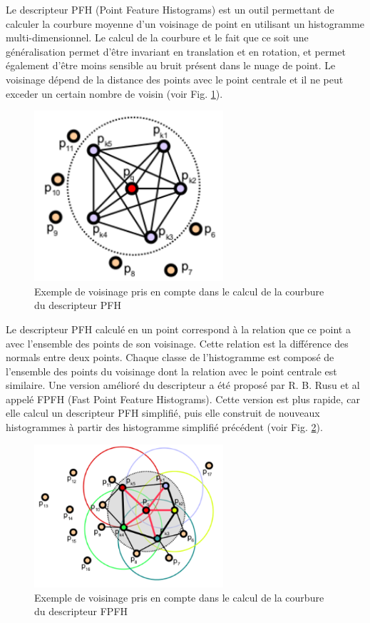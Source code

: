 Le descripteur PFH\cite{PFH} (Point Feature Histograms) est un outil permettant de calculer la courbure moyenne d'un voisinage de point en utilisant
un histogramme multi-dimensionnel. Le calcul de la courbure et le fait que ce soit une généralisation permet d'être invariant 
en translation et en rotation, et permet également d'être moins sensible au bruit présent dans le nuage de point. Le voisinage 
dépend de la distance des points avec le point centrale et il ne peut exceder un certain nombre de voisin (voir Fig. \ref{fig:pfhNeighborhood}).

\begin{figure}[!h]
  \begin{center}
    \includegraphics[width=7cm]{image/PFH.png}
    \caption{Exemple de voisinage pris en compte dans le calcul de la courbure du descripteur PFH}
    \label{fig:pfhNeighborhood}
  \end{center}
\end{figure}

Le descripteur PFH calculé en un point correspond à la relation que ce point a avec l'ensemble des points de son voisinage. Cette relation
est la différence des normals entre deux points. Chaque classe de l'histogramme est composé de l'ensemble des points du voisinage dont 
la relation avec le point centrale est similaire. Une version amélioré du descripteur a été proposé par R. B. Rusu et al\cite{FPFH} appelé
FPFH (Fast Point Feature Histograms). Cette version est plus rapide, car elle calcul un descripteur PFH simplifié, puis elle construit
de nouveaux histogrammes à partir des histogramme simplifié précédent (voir Fig. \ref{fig:fpfhNeighborhood}).

\begin{figure}[!h]
  \begin{center}
    \includegraphics[width=7cm]{image/FPFH.png}
    \caption{Exemple de voisinage pris en compte dans le calcul de la courbure du descripteur FPFH}
    \label{fig:fpfhNeighborhood}
  \end{center}
\end{figure}

